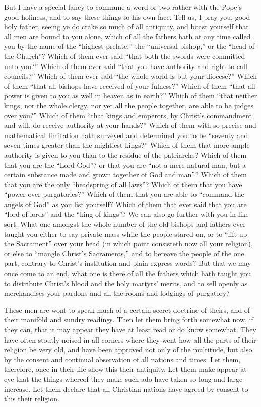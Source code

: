 But I have a special fancy to commune a word or two rather with the
Pope’s good holiness, and to say these things to his own face.
Tell us, I pray you, good holy father, seeing ye do crake so much of
all antiquity, and boast yourself that all men are bound to you alone,
which of all the fathers hath at any time called you by the name of
the “highest prelate,” the “universal bishop,”
or the “head of the Church”? Which of them ever said
“that both the swords were committed unto you?” Which
of them ever said “that you have authority and right to call councils?”
Which of them ever said “the whole world is but your diocese?”
Which of them “that all bishops have received of your fulness?”
Which of them “that all power is given to you as well in heaven
as in earth?” Which of them “that neither kings, nor
the whole clergy, nor yet all the people together, are able to be judges
over you?” Which of them “that kings and emperors,
by Christ’s commandment and will, do receive authority at your
hands?” Which of them with so precise and mathematical limitation
hath surveyed and determined you to be “seventy and
seven times greater than the mightiest kings?” Which of
them that more ample authority is given to you than to the residue of
the patriarchs? Which of them that you are the “Lord God”?
or that you are “not a mere natural man, but a certain substance
made and grown together of God and man”? Which of them that
you are the only “headspring of all laws”? Which of
them that you have “power over purgatories?” Which
of them that you are able to “command the angels of God”
as you list yourself? Which of them that ever said that you are
“lord of lords” and the “king of kings”?
We can also go further with you in like sort. What one amongst
the whole number of the old bishops and fathers ever taught you either
to say private mass while the people stared on, or to “lift up
the Sacrament” over your head (in which point consisteth now all
your religion), or else to “mangle Christ’s Sacraments,”
and to bereave the people of the one part, contrary to Christ’s
institution and plain express words? But that we may once come
to an end, what one is there of all the fathers which hath taught you
to distribute Christ’s blood and the holy martyrs’ merits,
and to sell openly as merchandises your pardons and all the rooms and
lodgings of purgatory?

These
men are wont to speak much of a certain secret doctrine of theirs, and
of their manifold and sundry readings. Then let them bring forth
somewhat now, if they can, that it may appear they have at least read
or do know somewhat. They have often stoutly noised in all corners
where they went how all the parts of their religion be very old, and
have been approved not only of the multitude, but also by the consent
and continual observation of all nations and times. Let them,
therefore, once in their life show this their antiquity. Let them
make appear at eye that the things whereof they make such ado have taken
so long and large increase. Let them declare that all Christian
nations have agreed by consent to this their religion.


